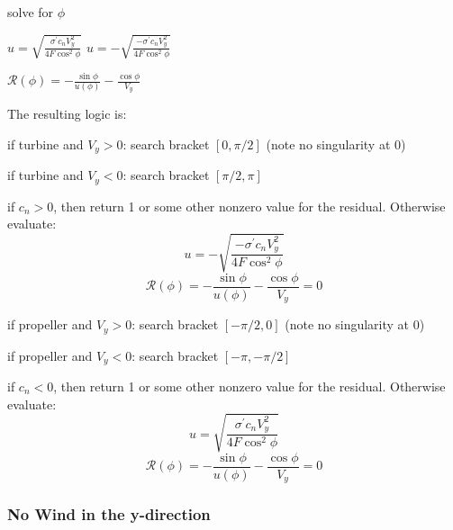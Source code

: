 \documentclass{article}
\begin{document}
\begin{algorithm}[htbp]
\caption{solve for $\phi$}
\begin{algorithmic}


    \State $u = \sqrt{\frac{\sigma^\prime c_n V_y^2}{4 F \cos^2\phi}}$
\Else
    \State $u = -\sqrt{\frac{-\sigma^\prime c_n V_y^2}{4 F \cos^2\phi}}$
\EndIf

\State $\mathcal{R}(\phi) = - \frac{\sin\phi}{u(\phi)} - \frac{\cos\phi}{V_y}$

\end{algorithmic}
\label{alg:complete}
\end{algorithm}

The resulting logic is:

if turbine and $V_y > 0$: search bracket $[0, \pi/2]$ (note no singularity at 0)

if turbine and $V_y < 0$: search bracket $[\pi/2, \pi]$

if $c_n > 0$, then return 1 or some other nonzero value for the residual.  Otherwise evaluate:
\begin{equation}
    u = -\sqrt{\frac{-\sigma^\prime c_n V_y^2}{4 F \cos^2\phi}}
\end{equation}
\begin{equation}
    \mathcal{R}(\phi) = - \frac{\sin\phi}{u(\phi)} - \frac{\cos\phi}{V_y} = 0
\end{equation}


if propeller and $V_y > 0$: search bracket $[-\pi/2, 0]$ (note no singularity at 0)

if propeller and $V_y < 0$: search bracket $[-\pi, -\pi/2]$

if $c_n < 0$, then return 1 or some other nonzero value for the residual.  Otherwise evaluate:
\begin{equation}
    u = \sqrt{\frac{\sigma^\prime c_n V_y^2}{4 F \cos^2\phi}}
\end{equation}
\begin{equation}
    \mathcal{R}(\phi) = - \frac{\sin\phi}{u(\phi)} - \frac{\cos\phi}{V_y} = 0
\end{equation}

\subsubsection{No Wind in the y-direction}
\end{document}
